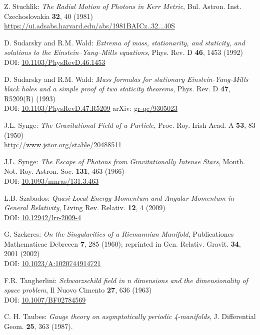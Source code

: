 \begin{thebibliography}{123}
Z. Stuchl\'{\i}k: {\em The Radial Motion of Photons in Kerr Metric},
Bul. Astron. Inst. Czechoslovakia {\bf 32}, 40 (1981)\\
\url{https://ui.adsabs.harvard.edu/abs/1981BAICz..32...40S}

D. Sudarsky and R.M. Wald: {\em Extrema of mass, stationarity, and staticity,
and solutions to the Einstein–Yang–Mills equations},
Phys. Rev. D {\bf 46}, 1453 (1992)\\
DOI: \href{https://doi.org/10.1103/PhysRevD.46.1453}{10.1103/PhysRevD.46.1453}

D. Sudarsky and R.M. Wald:
{\em Mass formulas for stationary Einstein-Yang-Mills black holes and a simple proof of two staticity theorems},
Phys. Rev. D {\bf 47}, R5209(R) (1993)\\
DOI: \href{https://doi.org/10.1103/PhysRevD.47.R5209}{10.1103/PhysRevD.47.R5209}\hfill
arXiv: \href{https://arxiv.org/abs/gr-qc/9305023}{gr-qc/9305023}

J.L. Synge: {\em The Gravitational Field of a Particle},
Proc. Roy. Irish Acad. A {\bf 53}, 83 (1950)\\
\url{http://www.jstor.org/stable/20488511}

J.L. Synge: {\em The Escape of Photons from Gravitationally Intense Stars},
Month. Not. Roy. Astron. Soc. {\bf 131}, 463 (1966)\\
DOI: \href{https://doi.org/10.1093/mnras/131.3.463}{10.1093/mnras/131.3.463}

L.B. Szabados:
{\em Quasi-Local Energy-Momentum and Angular Momentum in General Relativity},
Living Rev. Relativ. {\bf 12}, 4 (2009)\\
DOI: \href{https://doi.org/10.12942/lrr-2009-4}{10.12942/lrr-2009-4}

G. Szekeres:
{\em On the Singularities of a Riemannian Manifold},
Publicationes Mathematicae Debrecen {\bf 7}, 285 (1960); reprinted in
Gen. Relativ. Gravit. {\bf 34}, 2001 (2002)\\
DOI: \href{https://doi.org/10.1023/A:1020744914721}{10.1023/A:1020744914721}

F.R. Tangherlini:
{\em Schwarzschild field in n dimensions and the dimensionality of space problem},
Il Nuovo Cimento {\bf 27}, 636 (1963)\\
DOI: \href{https://doi.org/10.1007/BF02784569}{10.1007/BF02784569}

C. H. Taubes:
{\em Gauge theory on asymptotically periodic 4-manifolds},
J. Differential Geom. {\bf 25}, 363 (1987).


\end{thebibliography}
